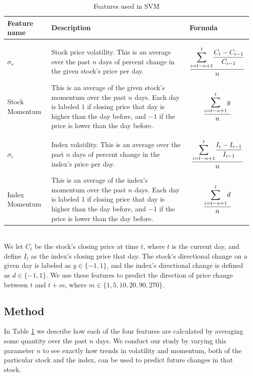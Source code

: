 \documentclass[pageno]{jpaper}
\begin{document}
\begin{table}%
\caption{Features used in SVM} \label{table: features}
\small
\begin{tabular}{p{3cm} p{6cm} p{6cm}}
\hline
Feature name & Description & Formula \\
\hline \\
$ \sigma_s$ & Stock price volatility. This is an average over the past $n$ days of percent change in the given stock's price per day. & $$\dfrac{\mathlarger{\sum}_{i=t-n+1}^t \dfrac{C_i - C_{i-1}}{C_{i-1}}}{n}$$ \\
Stock Momentum & This is an average of the given stock's momentum over the past $n$ days. Each day is labeled $1$ if closing price that day is higher than the day before, and $-1$ if the price is lower than the day before. & $$\dfrac{\mathlarger{\sum}_{i=t-n+1}^t y}{n}$$ \\ \\
$\sigma_i$ & Index volatility. This is an average over the past $n$ days of percent change in the index's price per day. & $$\dfrac{\mathlarger{\sum}_{i=t-n+1}^t \dfrac{I_i - I_{i-1}}{I_{i-1}}}{n}$$ \\ 
Index Momentum & This is an average of the index's momentum over the past $n$ days. Each day is labeled $1$ if closing price that day is higher than the day before, and $-1$ if the price is lower than the day before. & $$\dfrac{\mathlarger{\sum}_{i=t-n+1}^t d}{n}$$ \\ \hline
\end{tabular}
\footnotesize
\\We let $C_t$ be the stock's closing price at time $t$, where $t$ is the current day, and define $I_t$ as the index's closing price that day. The stock's directional change on a given day is labeled as $y \in \{-1, 1\}$, and the index's directional change is defined as $d \in \{-1, 1\}$. We use these features to predict the direction of price change between $t$ and $t + m$, where $m \in \{1, 5, 10, 20, 90, 270\}$.
\end{table}
\medskip

\subsection{Method}
In Table \ref{table: features} we describe how each of the four features are calculated by averaging some quantity over the past $n$ days. We conduct our study by varying this parameter $n$ to see exactly how trends in volatility and momentum, both of the particular stock and the index, can be used to predict future changes in that stock.
\end{document}
